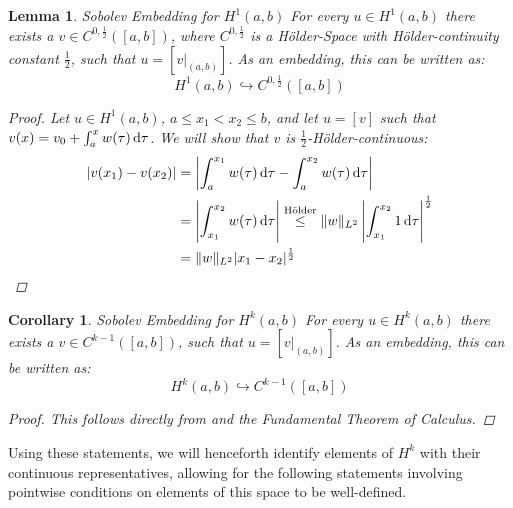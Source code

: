 \documentclass[headsepline,footsepline,footinclude=false,oneside,fontsize=11pt,paper=a4,listof=totoc,bibliography=totoc]{scrbook} %
\newtheorem{lemma}{Lemma}
\newtheorem{corollary}{Corollary}
\begin{document}
\begin{lemma} Sobolev Embedding for $H^1(a,b)$ \newline
	For every $u \in H^1(a,b)$ there exists a $v \in C^{0,\frac{1}{2}}([a,b])$, where $C^{0,\frac{1}{2}}$ is a Hölder-Space with Hölder-continuity constant $\frac{1}{2}$, such that $u = [v \vert_{(a,b)}]$. As an embedding, this can be written as:
	\begin{equation}
	H^1(a,b) \hookrightarrow C^{0,\frac{1}{2}}([a,b])
	\end{equation}
	\begin{proof}
	Let $u \in H^1(a,b)$, $a \leq x_1 < x_2 \leq b$, and let $u = [v]$ such that $v(x) = v_0 + \int_a^x w(\tau) \dif \tau$. We will show that $v$ is $\frac{1}{2}$-Hölder-continuous:
	\begin{align*}
	\vert v(x_1) - v(x_2) \vert &= \left\vert \int_{a}^{x_1} w(\tau) \dif \tau - \int_{a}^{x_2} w(\tau) \dif \tau \right\vert \\
	&= \left\vert \int_{x_1}^{x_2} w(\tau) \dif \tau \right\vert \overset{\textnormal{Hölder}}{\leq} \Vert w \Vert_{L^2} \left\vert \int_{x_1}^{x_2} 1 \dif \tau \right\vert ^{\frac{1}{2}} \\
	& = \Vert w \Vert_{L^2} \vert x_1 - x_2 \vert ^{\frac{1}{2}}
	\end{align*}
	\end{proof}
\end{lemma}

\begin{corollary} Sobolev Embedding for $H^k(a,b)$ \newline
		For every $u \in H^k(a,b)$ there exists a $v \in C^{k-1}([a,b])$, such that $u = [v \vert_{(a,b)}]$. As an embedding, this can be written as:
	\begin{equation}
	H^k(a,b) \hookrightarrow C^{k-1}([a,b])
	\end{equation}
	\begin{proof}
		This follows directly from  and the Fundamental Theorem of Calculus.
	\end{proof}
\end{corollary}
	

Using these statements, we will henceforth identify elements of $H^k$ with their continuous representatives, allowing for the following statements involving pointwise conditions on elements of this space to be well-defined.
\end{document}

